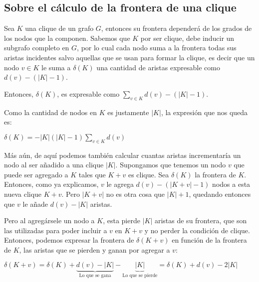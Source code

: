 \subsection*{Sobre el c\'alculo de la frontera de una clique\label{notas:calc_front}}
\par Sea $K$ una clique de un grafo $G$, entonces su frontera depender\'a de los
    grados de los nodos que la componen. Sabemos que $K$ por ser clique, debe inducir
    un subgrafo completo en $G$, por lo cual cada nodo suma a la frontera
    todas sus aristas incidentes salvo aquellas que se usan para formar la
    clique, es decir que un nodo $v \in K$ le suma a $\delta(K)$ una cantidad
    de aristas expresable como $d(v)-(|K|-1)$.

\bigskip
\par Entonces, $\delta(K)$, es expresable como $\displaystyle\sum_{v \in K}d(v) - (|K|-1)$.
\bigskip

\par Como la cantidad de nodos en $K$ es justamente $|K|$, la expresi\'on
    que nos queda es:

\bigskip
\par $\delta(K) = -|K|(|K|-1)\displaystyle\sum_{v \in K}d(v)$
\bigskip

\par M\'as a\'un, de aqu\'i podemos tambi\'en calcular cuantas aristas
    incrementar\'ia un nodo al ser a\~nadido a una clique $|K|$. Supongamos
    que tenemos un nodo $v$ que puede ser agregado a $K$ tales que $K+v$
    es clique. Sea $\delta(K)$ la frontera de $K$. Entonces, como ya explicamos,
    $v$ le agrega $d(v)-(|K+v|-1)$ nodos a esta nueva clique $K+v$. Pero $|K+v|$
    no es otra cosa que $|K|+1$, quedando entonces que $v$ le a\~nade
    $d(v)-|K|$ aristas.

\par Pero al agreg\'arsele un nodo a $K$, esta pierde $|K|$ aristas de su frontera,
    que son las utilizadas para poder incluir a $v$ en $K+v$ y no perder la
    condici\'on de clique. Entonces, podemos expresar la frontera de $\delta(K+v)$
    en funci\'on de la frontera de $K$, las aristas que se pierden y ganan por agregar
    a $v$:

\bigskip

\par $\delta(K+v) = \delta(K) + \underbrace{d(v)-|K|}_{\text{Lo que se gana}}
    - \underbrace{|K|}_{\text{Lo que se pierde}} = \delta(K) + d(v) - 2|K|$

{}

